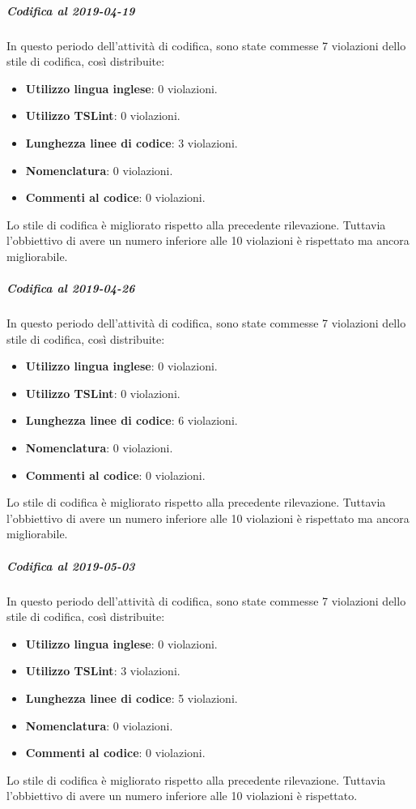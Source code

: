 \subparagraph{Codifica al 2019-04-19}
In questo periodo dell'attività di codifica, sono state commesse 7 violazioni dello stile di codifica, così distribuite:
 \begin{itemize}
 	\item \textbf{Utilizzo lingua inglese}: 0 violazioni.
 	\item \textbf{Utilizzo TSLint}: 0 violazioni.
 	\item \textbf{Lunghezza linee di codice}: 3 violazioni.
 	\item \textbf{Nomenclatura}: 0 violazioni.
 	\item \textbf{Commenti al codice}: 0 violazioni.
 \end{itemize}
Lo stile di codifica è migliorato rispetto alla precedente rilevazione. Tuttavia l'obbiettivo di avere un numero inferiore alle 10 violazioni è rispettato ma ancora migliorabile.

\subparagraph{Codifica al 2019-04-26}
In questo periodo dell'attività di codifica, sono state commesse 7 violazioni dello stile di codifica, così distribuite:
 \begin{itemize}
 	\item \textbf{Utilizzo lingua inglese}: 0 violazioni.
 	\item \textbf{Utilizzo TSLint}: 0 violazioni.
 	\item \textbf{Lunghezza linee di codice}: 6 violazioni.
 	\item \textbf{Nomenclatura}: 0 violazioni.
 	\item \textbf{Commenti al codice}: 0 violazioni.
 \end{itemize}
Lo stile di codifica è migliorato rispetto alla precedente rilevazione. Tuttavia l'obbiettivo di avere un numero inferiore alle 10 violazioni è rispettato ma ancora migliorabile.

\subparagraph{Codifica al 2019-05-03}
In questo periodo dell'attività di codifica, sono state commesse 7 violazioni dello stile di codifica, così distribuite:
 \begin{itemize}
 	\item \textbf{Utilizzo lingua inglese}: 0 violazioni.
 	\item \textbf{Utilizzo TSLint}: 3 violazioni.
 	\item \textbf{Lunghezza linee di codice}: 5 violazioni.
 	\item \textbf{Nomenclatura}: 0 violazioni.
 	\item \textbf{Commenti al codice}: 0 violazioni.
 \end{itemize}
Lo stile di codifica è migliorato rispetto alla precedente rilevazione. Tuttavia l'obbiettivo di avere un numero inferiore alle 10 violazioni è rispettato.

